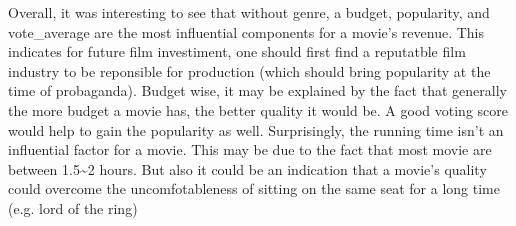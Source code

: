 \documentclass[11pt]{article}
\begin{document}
Overall, it was interesting to see that without genre, a budget,
popularity, and vote\_average are the most influential components for a
movie's revenue. This indicates for future film investiment, one should
first find a reputatble film industry to be reponsible for production
(which should bring popularity at the time of probaganda). Budget wise,
it may be explained by the fact that generally the more budget a movie
has, the better quality it would be. A good voting score would help to
gain the popularity as well. Surprisingly, the running time isn't an
influential factor for a movie. This may be due to the fact that most
movie are between 1.5\textasciitilde{}2 hours. But also it could be an
indication that a movie's quality could overcome the uncomfotableness of
sitting on the same seat for a long time (e.g. lord of the ring)


    
    
    
    
\end{document}
